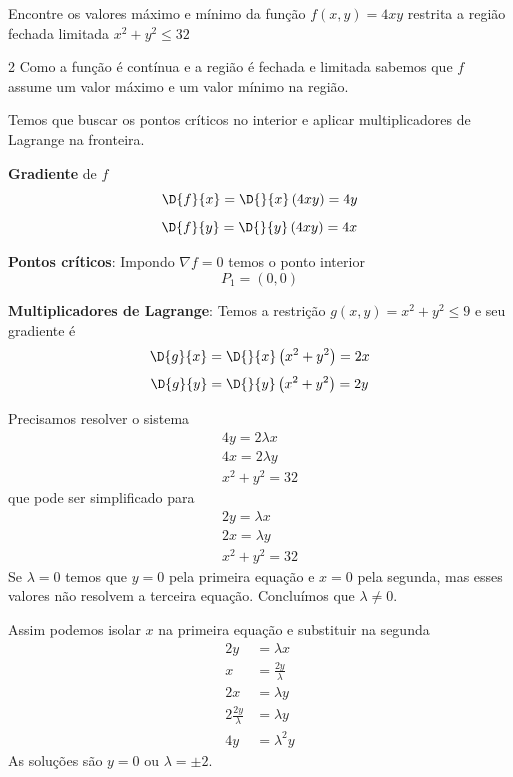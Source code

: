 \documentclass[a4paper,12pt,fleqn]{article}
\begin{document}
Encontre os valores máximo e mínimo da função
\(
  f(x, y) = 4xy
\)
restrita a região fechada limitada
\(
  x^2 + y^2 \leq 32
\)
\clearpagequestiononly

\begin{answer}
\setlength\columnsep{3em}
\setlength{\jot}{5pt}
\begin{multicols*}{2}
  \raggedcolumns
  Como a função é contínua e a região é fechada e limitada sabemos que
  $f$ assume um valor máximo e um valor mínimo na região.

  \vspace{\baselineskip}
  Temos que buscar os pontos críticos no interior e aplicar multiplicadores
  de Lagrange na fronteira.

  \vspace{\baselineskip}
  \textbf{Gradiente} de $f$
  \[
    \D{f}{x}
    = \D{}{x}\left(4xy\right)
    = 4y
  \]
  \[
    \D{f}{y}
    = \D{}{y}\left(4xy\right)
    = 4x
  \]

  \vspace{\baselineskip}
  \textbf{Pontos críticos}:
  Impondo \(\nabla f = 0\) temos o ponto interior
  \[
    P_1 = (0, 0)
  \]

  \vspace{\baselineskip}
  \textbf{Multiplicadores de Lagrange}:
  Temos a restrição \(g(x, y) = x^2 + y^2 \leq 9\) e seu gradiente é
  \[
    \D{g}{x}
    = \D{}{x}\left(x^2 + y^2\right)
    = 2x
  \]
  \[
    \D{g}{y}
    = \D{}{y}\left(x^2 + y^2\right)
    = 2y
  \]

  Precisamos resolver o sistema
  \begin{gather*}
    4y = 2\lambda x \\
    4x = 2\lambda y \\
    x^2 + y^2 = 32
  \end{gather*}
  que pode ser simplificado para
  \begin{gather*}
    2y = \lambda x \\
    2x = \lambda y \\
    x^2 + y^2 = 32
  \end{gather*}
  Se $\lambda=0$ temos que $y=0$ pela primeira equação e $x=0$ pela segunda,
  mas esses valores não resolvem a terceira equação. Concluímos que $\lambda\neq0$.

  Assim podemos isolar $x$ na primeira equação e substituir na segunda
  \begin{align*}
    2y                  & = \lambda x          \\
    x                   & = \frac{2y}{\lambda} \\[3mm]
    2x                  & = \lambda y          \\
    2\frac{2y}{\lambda} & = \lambda y          \\
    4y                  & = \lambda^2 y
  \end{align*}
  As soluções são $y=0$ ou $\lambda=\pm 2$.


\end{multicols*}
\end{answer}
\end{document}
